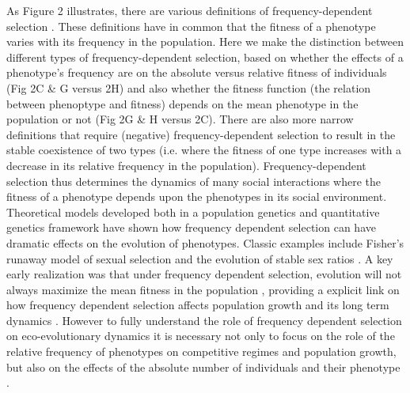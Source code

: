 \documentclass{article}
\begin{document}
 As Figure 2 illustrates, there are various definitions of frequency-dependent selection \citep{Heino1998}. These definitions have in common that the fitness of a phenotype varies with its frequency in the population. Here we make the distinction between different types of frequency-dependent selection, based on whether the effects of a phenotype's frequency are on the absolute versus relative fitness  of individuals (Fig 2C \& G versus 2H) and also whether the fitness function (the relation between phenoptype and fitness) depends on the mean phenotype in the population or not (Fig 2G \& H versus 2C). There are also more narrow definitions that require (negative) frequency-dependent selection to result in the stable coexistence of two types (i.e. where the fitness of one type increases with a decrease in its relative frequency in the population). Frequency-dependent selection thus determines the dynamics of many social interactions where the fitness of a phenotype depends upon the phenotypes in its social environment. Theoretical models developed both in a population genetics \citep{Wright1969} and quantitative genetics \citep{Lande2007, Engen2020} framework have shown how frequency dependent selection can have dramatic effects on the evolution of phenotypes. Classic examples include Fisher's runaway model of sexual selection and the evolution of stable sex ratios \citep{Fisher1930}. A key early realization was that under frequency dependent selection, evolution will not always maximize the mean fitness in the population \citep{Wright1969}, providing a explicit link on how frequency dependent selection affects population growth and its long term dynamics \citep{Svensson2018}. However to fully understand the role of frequency dependent selection on eco-evolutionary dynamics it is necessary not only to focus on the role of the relative frequency of phenotypes on competitive regimes and population growth, but also on the effects of the absolute number of individuals and their phenotype \citep{Anderson1971, Matessi1976, Asmussen1983, Heino1998, Joshi2001, Engen2020}. 
 
\end{document}
